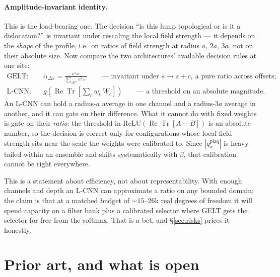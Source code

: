 \documentclass[11pt,a4paper]{article}
\newcommand{\Tr}{\operatorname{Tr}}
\newcommand{\dx}{\Delta x}
\begin{document}
\paragraph{Amplitude-invariant identity.} This is the load-bearing one. The
decision ``is this lump topological or is it a dislocation?'' is invariant under
rescaling the local field strength --- it depends on the \emph{shape} of the
profile, i.e.\ on ratios of field strength at radius $a$, $2a$, $3a$, not on
their absolute size. Now compare the two architectures' available decision rules
at one site:
\begin{align}
  \text{GELT:}\quad & \alpha_{\dx} = \frac{e^{s_{\dx}}}{\sum_{\dx'} e^{s_{\dx'}}}
    \qquad\text{---\ invariant under } s \to s + c, \ \text{a pure ratio across offsets;} \\
  \text{L-CNN:}\quad & g\!\left(\operatorname{Re}\Tr\!\left[\textstyle\sum_{c} w_c\, W_c\right]\right)
    \qquad\text{---\ a threshold on an absolute magnitude.}
\end{align}
An L-CNN can hold a radius-$a$ average in one channel and a radius-$3a$ average
in another, and it can gate on their difference. What it cannot do with fixed
weights is gate on their \emph{ratio}: the threshold in
$\mathrm{ReLU}(\operatorname{Re}\Tr[A - B])$ is an absolute number, so the
decision is correct only for configurations whose local field strength sits near
the scale the weights were calibrated to. Since $|q^{\mathrm{plaq}}_x|$ is
heavy-tailed within an ensemble and shifts systematically with $\beta$, that
calibration cannot be right everywhere.

This is a statement about efficiency, not about representability. With enough
channels and depth an L-CNN can approximate a ratio on any bounded domain; the
claim is that at a matched budget of $\sim 15$--$26$k real degrees of freedom it
will spend capacity on a filter bank plus a calibrated selector where GELT gets
the selector for free from the softmax. That is a bet, and \S\ref{sec:risks}
prices it honestly.

\section{Prior art, and what is open}
\label{sec:prior}
\end{document}
